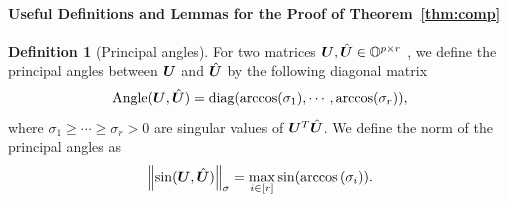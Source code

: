 \documentclass[lettersize,journal]{IEEEtran}
\theoremstyle{definition}
\theoremstyle{definition}
\newtheorem{defn}{Definition}
\newcommand{\of}[1]{\left(#1\right)}
\def\fixme#1#2{\textbf{\color{red}[FIXME (#1): #2]}}
\begin{document}
\paragraph{Useful Definitions and Lemmas for the Proof of Theorem~\ref{thm:comp}} 
\begin{defn}[Principal angles] For two matrices $\bm{U}, \hat {\bm{U}} \in \mathbb{O}^{p \times r}$ %
, we define the principal angles between $\bm{U}$ and $\hat {\bm{U}}$ by the following diagonal matrix
\begin{equation}
    \text{Angle}(\bm{U}, \hat {\bm{U}}) = \text{diag}( \arccos(\sigma_1), \cdots, \arccos (\sigma_r) ),
\end{equation}
where $\sigma_1 \geq \cdots \geq \sigma_r>0$ are singular values of $\bm{U}^T \hat {\bm{U}}$. 
We define the norm of the principal angles as 
\begin{equation}
     \onorm{\sin(\mU, \hat \mU)}_{\sigma} = \max_{i \in [r]} \sin ( \arccos \of{ \sigma_i} ).
\end{equation}




\end{defn}



\end{document}
